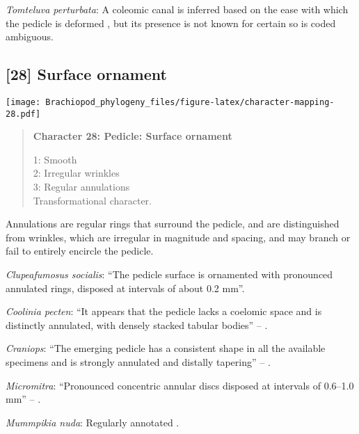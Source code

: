\documentclass[openany]{book}
\theoremstyle{definition}
\theoremstyle{definition}
\theoremstyle{definition}
\theoremstyle{remark}
\begin{document}
\hypertarget{Tomteluva_perturbata-coding-27}{}
\emph{Tomteluva perturbata}: A coleomic canal is inferred based on the
ease with which the pedicle is deformed
\citep{Holmer2018Evolutionarysignificance}, but its presence is not
known for certain so is coded ambiguous.

\subsection*{{[}28{]} Surface ornament}\label{surface-ornament-1}

\texttt{[image: Brachiopod\_phylogeny\_files/figure-latex/character-mapping-28.pdf]}

\begin{quote}
\textbf{Character 28: Pedicle: Surface ornament}

1: Smooth\\
2: Irregular wrinkles\\
3: Regular annulations\\
Transformational character.
\end{quote}

Annulations are regular rings that surround the pedicle, and are
distinguished from wrinkles, which are irregular in magnitude and
spacing, and may branch or fail to entirely encircle the pedicle.

\hypertarget{Clupeafumosus_socialis-coding-28}{}
\emph{Clupeafumosus socialis}: ``The pedicle surface is ornamented with
pronounced annulated rings, disposed at intervals of about 0.2 mm''.

\hypertarget{Coolinia_pecten-coding-28}{}
\emph{Coolinia pecten}: ``It appears that the pedicle lacks a coelomic
space and is distinctly annulated, with densely stacked tabular bodies''
-- \citet{Zhang2011Anobolellate}.

\hypertarget{Craniops-coding-28}{}
\emph{Craniops}: ``The emerging pedicle has a consistent shape in all
the available specimens and is strongly annulated and distally
tapering'' -- \citet{Holmer2018Evolutionarysignificance}.

\hypertarget{Micromitra-coding-28}{}
\emph{Micromitra}: ``Pronounced concentric annular discs disposed at
intervals of 0.6--1.0 mm'' --
\citet{Zhang2007Rhynchonelliformeanbrachiopods}.

\hypertarget{Mummpikia_nuda-coding-28}{}
\emph{Mummpikia nuda}: Regularly annotated \citep[see fig. 14.9
in][]{Hou2017Brachiopoda}.
\end{document}
